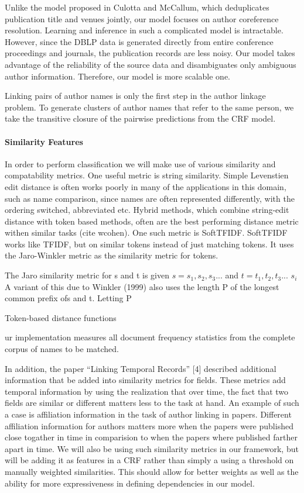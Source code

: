 \documentclass[twocolumn,letterpaper]{article}
\begin{document}
Unlike the model proposed in Culotta and
McCallum\cite{Culotta05aconditional}, which deduplicates publication
title and venues jointly, our model focuses on author coreference
resolution.  Learning and inference in such a complicated model is
intractable.  However, since the DBLP data is generated directly from
entire conference proceedings and journals, the publication records
are less noisy.  Our model takes advantage of the
reliability of the source data and disambiguates only ambiguous author
information.  Therefore, our model is more scalable one.

Linking pairs of author names is only the first step in the author
linkage problem.  To generate clusters of author names that refer to
the same person, we take the transitive closure of the pairwise
predictions from the CRF model.

\paragraph{Similarity Features} %
\label{par:similarity_features}
In order to perform classification we will make use of various similarity and compatability metrics. One useful metric is string similarity. Simple Levenstien edit distance is often works poorly in many of the applications in this domain, such as name comparison, since names are often represented differently, with the ordering switched, abbreviated etc. Hybrid methods, which combine string-edit distance with token based methods, often are the best performing distance metric withen similar tasks (cite wcohen). One such metric is SoftTFIDF. SoftTFIDF works like TFIDF, but on similar tokens instead of just matching tokens. It uses the Jaro-Winkler metric as the similarity metric for tokens. 

The Jaro similarity metric for s and t is given $s= s_1,s_2,s_3...$ and $t= t_1,t_2,t_3...$ $s_i$  
A variant of this due to Winkler (1999) also uses the length
P of the longest common preﬁx ofs and t. Letting P

Token-based distance functions

ur implementation measures all document frequency statistics from
the complete corpus of names to be matched.

In addition, the paper “Linking Temporal Records” [4] described additional information that be added into similarity metrics for fields. These metrics add temporal information by using the realization that over time, the fact that two fields are similar or different matters less to the task at hand. An example of such a case is affiliation information in the task of author linking in papers. Different affiliation information for authors matters more when the papers were published close togather in time in comparision to when the papers where published farther apart in time. We will also be using such similarity metrics in our framework, but will be adding it as features in a CRF rather than simply a using a threshold on manually weighted similarities. This should allow for better weights as well as the ability for more expressiveness in defining dependencies in our model.
\end{document}
